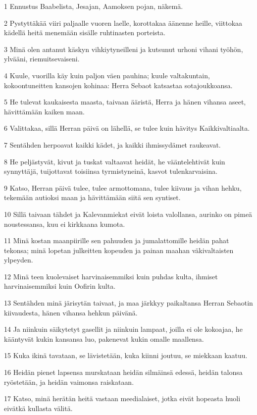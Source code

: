 \par 1 Ennustus Baabelista, Jesajan, Aamoksen pojan, näkemä.
\par 2 Pystyttäkää viiri paljaalle vuoren laelle, korottakaa äänenne heille, viittokaa kädellä heitä menemään sisälle ruhtinasten porteista.
\par 3 Minä olen antanut käskyn vihkiytyneilleni ja kutsunut urhoni vihani työhön, ylvääni, riemuitsevaiseni.
\par 4 Kuule, vuorilla käy kuin paljon väen pauhina; kuule valtakuntain, kokoontuneitten kansojen kohinaa: Herra Sebaot katsastaa sotajoukkoansa.
\par 5 He tulevat kaukaisesta maasta, taivaan ääristä, Herra ja hänen vihansa aseet, hävittämään kaiken maan.
\par 6 Valittakaa, sillä Herran päivä on lähellä, se tulee kuin hävitys Kaikkivaltiaalta.
\par 7 Sentähden herpoavat kaikki kädet, ja kaikki ihmissydämet raukeavat.
\par 8 He peljästyvät, kivut ja tuskat valtaavat heidät, he vääntelehtivät kuin synnyttäjä, tuijottavat toisiinsa tyrmistyneinä, kasvot tulenkarvaisina.
\par 9 Katso, Herran päivä tulee, tulee armottomana, tulee kiivaus ja vihan hehku, tekemään autioksi maan ja hävittämään siitä sen syntiset.
\par 10 Sillä taivaan tähdet ja Kalevanmiekat eivät loista valollansa, aurinko on pimeä noustessansa, kuu ei kirkkaana kumota.
\par 11 Minä kostan maanpiirille sen pahuuden ja jumalattomille heidän pahat tekonsa; minä lopetan julkeitten kopeuden ja painan maahan väkivaltaisten ylpeyden.
\par 12 Minä teen kuolevaiset harvinaisemmiksi kuin puhdas kulta, ihmiset harvinaisemmiksi kuin Oofirin kulta.
\par 13 Sentähden minä järisytän taivaat, ja maa järkkyy paikaltansa Herran Sebaotin kiivaudesta, hänen vihansa hehkun päivänä.
\par 14 Ja niinkuin säikytetyt gasellit ja niinkuin lampaat, joilla ei ole kokoajaa, he kääntyvät kukin kansansa luo, pakenevat kukin omalle maallensa.
\par 15 Kuka ikinä tavataan, se lävistetään, kuka kiinni joutuu, se miekkaan kaatuu.
\par 16 Heidän pienet lapsensa murskataan heidän silmäinsä edessä, heidän talonsa ryöstetään, ja heidän vaimonsa raiskataan.
\par 17 Katso, minä herätän heitä vastaan meedialaiset, jotka eivät hopeasta huoli eivätkä kullasta välitä.
